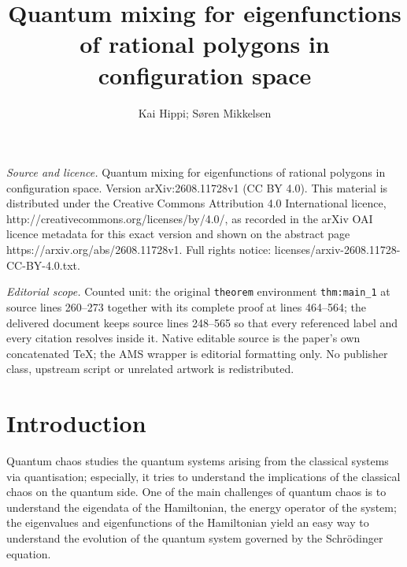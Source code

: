 \documentclass[10pt,a4paper]{amsart}
\newcommand{\1}{\mathrm{\mathbf{1}}}
\numberwithin{equation}{section}
\begin{document}
\title[Quantum mixing for eigenfunctions of rational polygons in co]{Quantum mixing for eigenfunctions of rational polygons in configuration space}
\author{Kai Hippi; S{ø}ren Mikkelsen}
\date{}
\maketitle
\noindent\emph{Source and licence.} Quantum mixing for eigenfunctions of rational polygons in configuration space. Version arXiv:2608.11728v1 (CC BY 4.0). This material is distributed under the Creative Commons Attribution 4.0 International licence, http://creativecommons.org/licenses/by/4.0/, as recorded in the arXiv OAI licence metadata for this exact version and shown on the abstract page https://arxiv.org/abs/2608.11728v1. Full rights notice: licenses/arxiv-2608.11728-CC-BY-4.0.txt.\par\smallskip
\noindent\textit{Editorial scope.} Counted unit: the original \texttt{theorem} environment \texttt{thm:main\_1} at source lines 260--273 together with its complete proof at lines 464--564; the delivered document keeps source lines 248--565 so that every referenced label and every citation resolves inside it. Native editable source is the paper's own concatenated TeX; the AMS wrapper is editorial formatting only. No publisher class, upstream script or unrelated artwork is redistributed.
\section{Introduction}


Quantum chaos studies the quantum systems arising from the classical systems via quantisation; especially, it tries to understand the implications of the classical chaos on the quantum side. One of the main challenges of quantum chaos is to understand the eigendata of the Hamiltonian, the energy operator of the system; the eigenvalues and eigenfunctions of the Hamiltonian yield an easy way to understand the evolution of the quantum system governed by the Schrödinger equation. 
\end{document}
